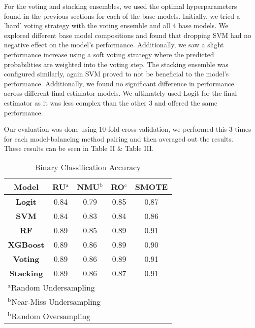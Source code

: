 \documentclass[conference]{IEEEtran}
\begin{document}
For the voting and stacking ensembles, we used the optimal hyperparameters found in the previous sections for each of the base models. Initially, we tried a 'hard' voting strategy with the voting ensemble and all 4 base models. We explored different base model compositions and found that dropping SVM had no negative effect on the model's performance. Additionally, we saw a slight performance increase using a soft voting strategy where the predicted probabilities are weighted into the voting step. The stacking ensemble was configured similarly, again SVM proved to not be beneficial to the model's performance. Additionally, we found no significant difference in performance across different final estimator models. We ultimately used Logit for the final estimator as it was less complex than the other 3 and offered the same performance.

Our evaluation was done using 10-fold cross-validation, we performed this 3 times for each model-balancing method pairing and then averaged out the results. These results can be seen in Table II \& Table III.

\begin{table}[htbp]
\caption{Binary Classification Accuracy}
\begin{center}
\begin{tabular}{|c|c|c|c|c|}
\hline
\textbf{Model}&{\textbf{RU$^{\mathrm{a}}$}}&{\textbf{NMU$^{\mathrm{b}}$}}&{\textbf{RO$^{\mathrm{c}}$}}&{\textbf{SMOTE}} \\
\hline
\textbf{Logit} & 0.84 & 0.79 & 0.85 & 0.87\\
\textbf{SVM} & 0.84 & 0.83 & 0.84 & 0.86\\
\textbf{RF} & 0.89 & 0.85 & 0.89 & 0.91\\
\textbf{XGBoost} & 0.89 & 0.86 & 0.89 & 0.90\\
\textbf{Voting} & 0.89 & 0.86 & 0.89 & 0.91\\
\textbf{Stacking} & 0.89 & 0.86 & 0.87 & 0.91\\
\hline
\multicolumn{4}{l}{$^{\mathrm{a}}$Random Undersampling}\\
\multicolumn{4}{l}{$^{\mathrm{b}}$Near-Miss Undersampling}\\
\multicolumn{4}{l}{$^{\mathrm{b}}$Random Oversampling}\\
\end{tabular}

\label{tab2}
\end{center}
\end{table}
\end{document}
